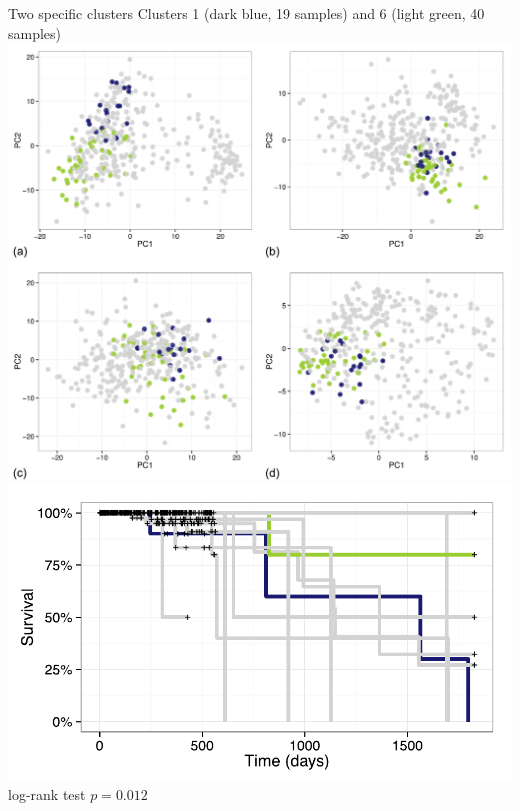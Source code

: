 \documentclass[t, final]{beamer}
\begin{document}
\begin{frame}{}
\begin{columns}[t]
\begin{column}{.32\linewidth}
\begin{block}{Two specific clusters}
  Clusters 1 (dark blue, 19 samples) and 6 (light green, 40 samples)
  \includegraphics[width=\textwidth]{Figures/breast-PCA-two} \\
  \includegraphics[width=\textwidth]{Figures/breast-survival-two} \\
  log-rank test $p = 0.012$
\end{block}


\end{column}
\end{columns}

\end{frame}
\end{document}
